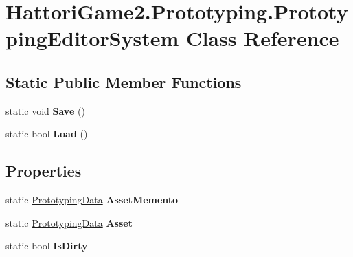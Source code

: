 \hypertarget{class_hattori_game2_1_1_prototyping_1_1_prototyping_editor_system}{}\section{Hattori\+Game2.\+Prototyping.\+Prototyping\+Editor\+System Class Reference}
\label{class_hattori_game2_1_1_prototyping_1_1_prototyping_editor_system}
\subsection*{Static Public Member Functions}
\begin{DoxyCompactItemize}
\item 
\hypertarget{class_hattori_game2_1_1_prototyping_1_1_prototyping_editor_system_ae5d4b83bfc9212da57413f9f4a0bbe8b}{}static void {\bfseries Save} ()\label{class_hattori_game2_1_1_prototyping_1_1_prototyping_editor_system_ae5d4b83bfc9212da57413f9f4a0bbe8b}

\item 
\hypertarget{class_hattori_game2_1_1_prototyping_1_1_prototyping_editor_system_a2454d67b92adb4d6d06429bd7b87e8d7}{}static bool {\bfseries Load} ()\label{class_hattori_game2_1_1_prototyping_1_1_prototyping_editor_system_a2454d67b92adb4d6d06429bd7b87e8d7}

\end{DoxyCompactItemize}
\subsection*{Properties}
\begin{DoxyCompactItemize}
\item 
\hypertarget{class_hattori_game2_1_1_prototyping_1_1_prototyping_editor_system_a8db380c42dc5a828c9238b5637ad95ae}{}static \hyperlink{class_hattori_game2_1_1_prototyping_1_1_prototyping_data}{Prototyping\+Data} {\bfseries Asset\+Memento}\label{class_hattori_game2_1_1_prototyping_1_1_prototyping_editor_system_a8db380c42dc5a828c9238b5637ad95ae}

\item 
\hypertarget{class_hattori_game2_1_1_prototyping_1_1_prototyping_editor_system_a6164b8ec0524119382d0ccbbb650e634}{}static \hyperlink{class_hattori_game2_1_1_prototyping_1_1_prototyping_data}{Prototyping\+Data} {\bfseries Asset}\label{class_hattori_game2_1_1_prototyping_1_1_prototyping_editor_system_a6164b8ec0524119382d0ccbbb650e634}

\item 
\hypertarget{class_hattori_game2_1_1_prototyping_1_1_prototyping_editor_system_af4b7a2cdc40fca38e0b5819a862b481d}{}static bool {\bfseries Is\+Dirty}\label{class_hattori_game2_1_1_prototyping_1_1_prototyping_editor_system_af4b7a2cdc40fca38e0b5819a862b481d}

\end{DoxyCompactItemize}
